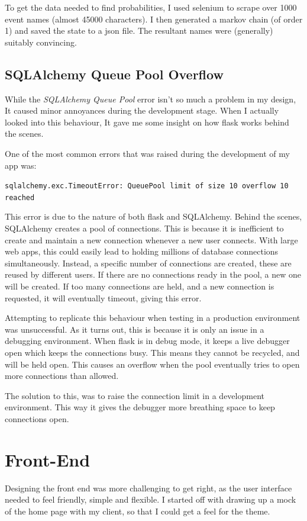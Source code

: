 \documentclass[a4paper,oneside,12pt]{report}
\begin{document}
	To get the data needed to find probabilities, I used selenium to scrape over 1000 event names (almost 45000 characters). I then generated a markov chain (of order 1) and saved the state to a json file. The resultant names were (generally) suitably convincing.

	\subsection{SQLAlchemy Queue Pool Overflow}
	While the \textit{SQLAlchemy Queue Pool} error isn't so much a problem in my design, It caused minor annoyances during the development stage. When I actually looked into this behaviour, It gave me some insight on how flask works behind the scenes. 
	
	One of the most common errors that was raised during the development of my app was:
	\begin{framed}
		\lstinline|sqlalchemy.exc.TimeoutError: QueuePool limit of size 10 overflow 10 reached|
	\end{framed}
	
	This error is due to the nature of both flask and SQLAlchemy. Behind the scenes, SQLAlchemy creates a pool of connections. This is because it is inefficient to create and maintain a new connection whenever a new user connects. With large web apps, this could easily lead to holding millions of database connections simultaneously. Instead, a specific number of connections are created, these are reused by different users. If there are no connections ready in the pool, a new one will be created. If too many connections are held, and a new connection is requested, it will eventually timeout, giving this error.

	Attempting to replicate this behaviour when testing in a production environment was unsuccessful. As it turns out, this is because it is only an issue in a debugging environment. When flask is in debug mode, it keeps a live debugger open which keeps the connections busy. This means they cannot be recycled, and will be held open. This causes an overflow when the pool eventually tries to open more connections than allowed.

	The solution to this, was to raise the connection limit in a development environment. This way it gives the debugger more breathing space to keep connections open.

	\section{Front-End}
	Designing the front end was more challenging to get right, as the user interface needed to feel friendly, simple and flexible. I started off with drawing up a mock of the home page with my client, so that I could get a feel for the theme.
\end{document}
